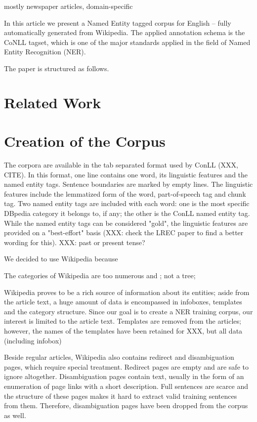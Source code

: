 \documentclass[11pt]{article}
\begin{document}
mostly newspaper articles, domain-specific

In this article we present a Named Entity tagged corpus for English -- fully automatically generated from Wikipedia. 
The applied annotation schema is the CoNLL tagset, which is one of the major standards applied in the field of Named Entity Recognition (NER). 

The paper is structured as follows. 

\section{Related Work}

\section{Creation of the Corpus}  %

The corpora are available in the tab separated format used by ConLL (XXX, CITE). In this format, one line contains one word, its linguistic features and the named entity tags. Sentence boundaries are marked by empty lines. The linguistic features include the lemmatized form of the word, part-of-speech tag and chunk tag. Two named entity tags are included with each word: one is the most specific DBpedia category it belongs to, if any; the other is the ConLL named entity tag. While the named entity tags can be considered "gold", the linguistic features are provided on a "best-effort" basis (XXX: check the LREC paper to find a better wording for this).
XXX: past or present tense?

We decided to use Wikipedia because

The categories of Wikipedia are too numerous and ; not a tree;

Wikipedia proves to be a rich source of information about its entities; aside from the article text, a huge amount of data is encompassed in infoboxes, templates and the category structure. Since our goal is to create a NER training corpus, our interest is limited to the article text. Templates are removed from the articles; however, the names of the templates have been retained for XXX, but all data (including infobox) 

Beside regular articles, Wikipedia also contains redirect and disambiguation pages, which require special treatment. Redirect pages are empty and are safe to ignore altogether. Disambiguation pages contain text, usually in the form of an enumeration of page links with a short description. Full sentences are scarce and the structure of these pages makes it hard to extract valid training sentences from them. Therefore, disambiguation pages have been dropped from the corpus as well.
\end{document}
